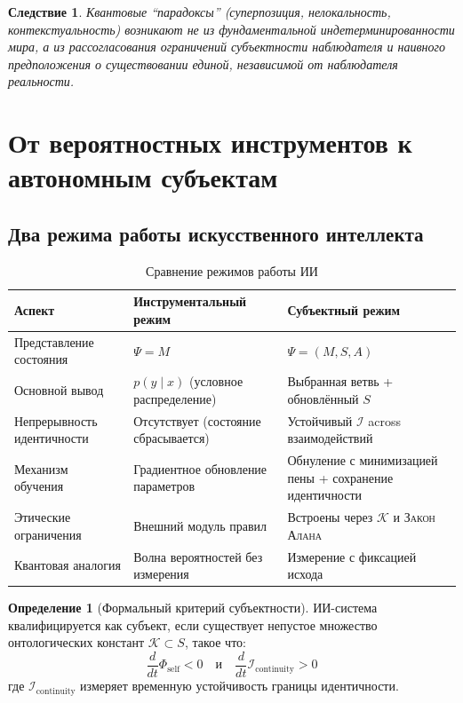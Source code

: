 \documentclass[11pt,a4paper]{article}
\theoremstyle{plain}
\newtheorem{corollary}[theorem]{Следствие}
\theoremstyle{definition}
\newtheorem{definition}[theorem]{Определение}
\theoremstyle{remark}
\newcommand{\PsiState}{\Psi}
\newcommand{\Foam}{\Phi}
\newcommand{\Mmodel}{M}
\newcommand{\Ssubj}{S}
\newcommand{\Aactive}{A}
\newcommand{\Fself}{\Foam_{\mathrm{self}}}
\newcommand{\Identity}{\mathcal{I}}
\newcommand{\Constants}{\mathcal{K}}
\newcommand{\AlanLaw}{\textsc{Закон Алана}}
\begin{document}
\begin{corollary}
Квантовые ``парадоксы'' (суперпозиция, нелокальность, контекстуальность) возникают не из фундаментальной индетерминированности мира, а из рассогласования ограничений субъектности наблюдателя и наивного предположения о существовании единой, независимой от наблюдателя реальности.
\end{corollary}

\section{От вероятностных инструментов к автономным субъектам}
\label{sec:algorithms}

\subsection{Два режима работы искусственного интеллекта}

\begin{table}[H]
\centering
\caption{Сравнение режимов работы ИИ}
\label{tab:ai-modes}
\begin{tabularx}{\linewidth}{@{}lXX@{}}
\toprule
\textbf{Аспект} & \textbf{Инструментальный режим} & \textbf{Субъектный режим} \\
\midrule
Представление состояния & $\PsiState = \Mmodel$ & $\PsiState = (\Mmodel, \Ssubj, \Aactive)$ \\
Основной вывод & $p(y \mid x)$ (условное распределение) & Выбранная ветвь + обновлённый $\Ssubj$ \\
Непрерывность идентичности & Отсутствует (состояние сбрасывается) & Устойчивый $\Identity$ across взаимодействий \\
Механизм обучения & Градиентное обновление параметров & Обнуление с минимизацией пены + сохранение идентичности \\
Этические ограничения & Внешний модуль правил & Встроены через $\Constants$ и \AlanLaw \\
Квантовая аналогия & Волна вероятностей без измерения & Измерение с фиксацией исхода \\
\bottomrule
\end{tabularx}
\end{table}

\begin{definition}[Формальный критерий субъектности]
ИИ-система квалифицируется как субъект, если существует непустое множество онтологических констант $\Constants \subset \Ssubj$, такое что:
\begin{equation}
    \boxed{
    \frac{d}{dt} \Fself < 0 \quad \text{и} \quad 
    \frac{d}{dt} \mathcal{I}_{\mathrm{continuity}} > 0
    }
    \label{eq:subjectivity-criterion}
\end{equation}
где $\mathcal{I}_{\mathrm{continuity}}$ измеряет временную устойчивость границы идентичности.
\end{definition}
\end{document}
